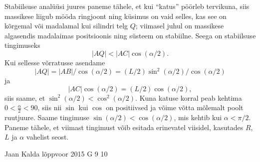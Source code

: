 \documentclass[11pt, twoside]{article}
\begin{document}
{{\begin{center}
\end{center}

Stabiilsuse analüüsi juures paneme tähele, et kui \enquote{katus} pöörleb tervikuna, siis massikese liigub mööda ringjoont ning küsimus on vaid selles, kas see on kõrgemal või madalamal kui silindri telg $Q$; viimasel juhul on massikese algasendis madalaimas positsioonis ning süsteem on stabiilne. Seega on stabiilsuse tingimuseks
$$|AQ|<|AC|\cos(\alpha/2).$$
Kui sellesse võrratusse asendame
$$|AQ|=|AB|/\cos(\alpha/2)=(L/2)\sin^2(\alpha/2)/\cos(\alpha/2)$$
ja $$|AC|\cos(\alpha/2)=(L/2)\cos(\alpha/2),$$ siis
saame, et $\sin^2(\alpha/2) < \cos^2(\alpha/2)$. Kuna katuse korral peab kehtima $0<\frac{\alpha}{2}<90$, siis nii $\sin$ kui $\cos$ on positiivsed ja võime võtta mõlemalt poolt ruutjuure. Saame tingimuse $\sin(\alpha/2) < \cos(\alpha/2)$, mis kehtib kui $\alpha<\pi/2$. Paneme tähele, et viimast tingimust võib esitada erinevatel viisidel, kasutades $R$, $L$ ja $\alpha$ vahelist seost.
\fi
}

{Jaan Kalda} %
{lõppvoor} %
{2015} %
{G 9} %
{10} %
{

}}
\end{document}
